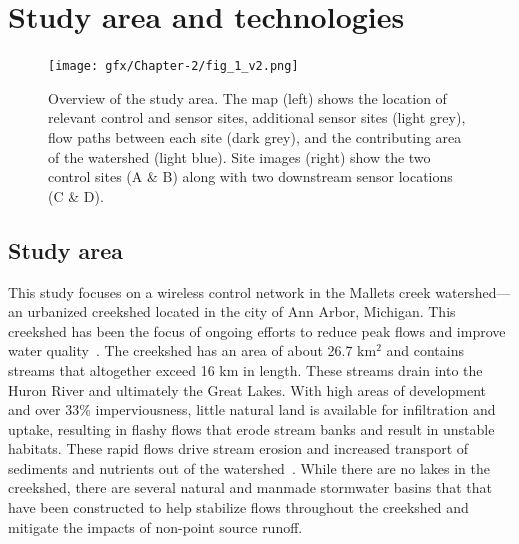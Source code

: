 \section{Study area and technologies}

\begin{figure}[H]
\centering
\texttt{[image: gfx/Chapter-2/fig\_1\_v2.png]}
\caption{Overview of the study area. The map (left) shows the location of relevant control and sensor sites, additional sensor sites (light grey), flow paths between each site (dark grey), and the contributing area of the watershed (light blue). Site images (right) show the two control sites (A \& B) along with two downstream sensor locations (C \& D).
}\label{fig-ch2:fig1}
\end{figure}

\subsection{Study area}

This study focuses on a wireless control network in the Mallets creek watershed---an urbanized creekshed located in the city of Ann Arbor, Michigan. This creekshed has been the focus of ongoing efforts to reduce peak flows and improve water quality~\cite{HRWC_2011}.
The creekshed has an area of about 26.7 km$^2$ and contains streams that altogether exceed 16 km in length. These streams drain into the Huron River and ultimately the Great Lakes. With high areas of development and over 33\% imperviousness, little natural land is available for infiltration and uptake, resulting in flashy flows that erode stream banks and result in unstable habitats.
These rapid flows drive stream erosion and increased transport of sediments and nutrients out of the watershed~\cite{HRWC_2011}. 
While there are no lakes in the creekshed, there are several natural and manmade stormwater basins that that have been constructed to help stabilize flows throughout the creekshed and mitigate the impacts of non-point source runoff.

